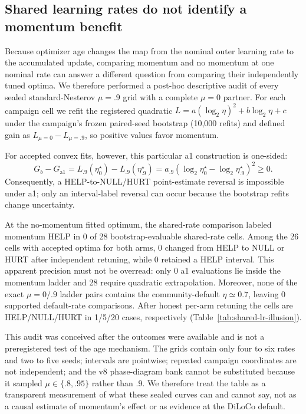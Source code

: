 \subsection{Shared learning rates do not identify a momentum benefit}
\label{sec:shared-lr-illusion}

Because optimizer age changes the map from the nominal outer learning rate to the accumulated update, comparing momentum and no momentum at one nominal rate can answer a different question from comparing their independently tuned optima. We therefore performed a post-hoc descriptive audit of every sealed standard-Nesterov $\mu=.9$ grid with a complete $\mu=0$ partner. For each campaign cell we refit the registered quadratic $L=a(\log_2\eta)^2+b\log_2\eta+c$ under the campaign's frozen paired-seed bootstrap (10,000 refits) and defined gain as $L_{\mu=0}-L_{\mu=.9}$, so positive values favor momentum.

For accepted convex fits, however, this particular a1 construction is one-sided:
\[
G_b-G_{\mathrm{a1}}=L_{.9}(\eta_0^\star)-L_{.9}(\eta_{.9}^\star)=a_{.9}\!\left(\log_2\eta_0^\star-\log_2\eta_{.9}^\star\right)^2\ge 0.
\]
Consequently, a HELP-to-NULL/HURT point-estimate reversal is impossible under a1; only an interval-label reversal can occur because the bootstrap refits change uncertainty.

At the no-momentum fitted optimum, the shared-rate comparison labeled momentum HELP in 0 of 28 bootstrap-evaluable shared-rate cells. Among the 26 cells with accepted optima for both arms, 0 changed from HELP to NULL or HURT after independent retuning, while 0 retained a HELP interval. This apparent precision must not be overread: only 0 a1 evaluations lie inside the momentum ladder and 28 require quadratic extrapolation. Moreover, none of the exact $\mu=0/.9$ ladder pairs contains the community-default $\eta\simeq0.7$, leaving 0 supported default-rate comparisons. After honest per-arm retuning the cells are HELP/NULL/HURT in 1/5/20 cases, respectively (Table~\ref{tab:shared-lr-illusion}).

This audit was conceived after the outcomes were available and is not a preregistered test of the age mechanism. The grids contain only four to six rates and two to five seeds; intervals are pointwise; repeated campaign coordinates are not independent; and the v8 phase-diagram bank cannot be substituted because it sampled $\mu\in\{.8,.95\}$ rather than $.9$. We therefore treat the table as a transparent measurement of what these sealed curves can and cannot say, not as a causal estimate of momentum's effect or as evidence at the DiLoCo default.
